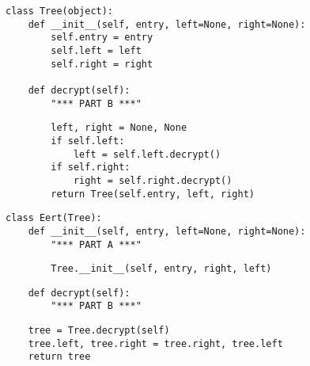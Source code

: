 \begin{lstlisting}
class Tree(object):
    def __init__(self, entry, left=None, right=None):
        self.entry = entry
        self.left = left
        self.right = right

    def decrypt(self):
        "*** PART B ***"
\end{lstlisting}

\begin{solution}[1.5in]
\begin{lstlisting}
        left, right = None, None
        if self.left:
            left = self.left.decrypt()
        if self.right:
            right = self.right.decrypt()
        return Tree(self.entry, left, right)
\end{lstlisting}
\end{solution}

\begin{lstlisting}
class Eert(Tree):
    def __init__(self, entry, left=None, right=None):
        "*** PART A ***"
\end{lstlisting}

\begin{solution}[1in]
\begin{lstlisting}
        Tree.__init__(self, entry, right, left)
\end{lstlisting}
\end{solution}

\begin{lstlisting}
    def decrypt(self):
        "*** PART B ***"
\end{lstlisting}

\begin{solution}[1.5in]
\begin{lstlisting}
    tree = Tree.decrypt(self)
    tree.left, tree.right = tree.right, tree.left
    return tree
\end{lstlisting}
\end{solution}